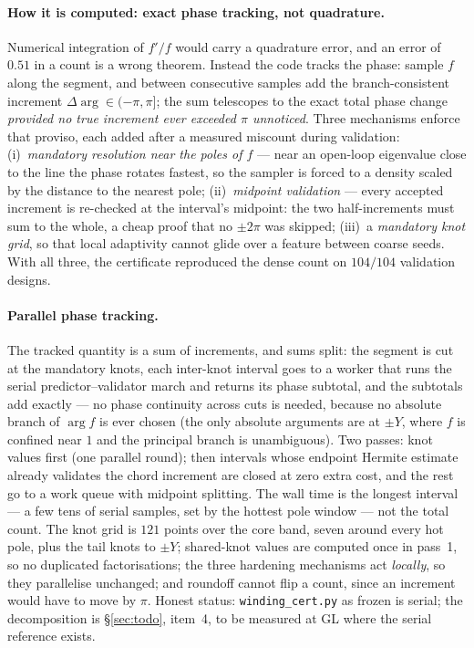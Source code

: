 \documentclass[11pt,a4paper]{article}
\newcommand{\code}[1]{\texttt{#1}}
\begin{document}
{\paragraph{How it is computed: exact phase tracking, not quadrature.}
Numerical integration of $f'/f$ would carry a quadrature error, and an error of $0.51$ in
a count is a wrong theorem.  Instead the code tracks the phase: sample $f$ along the
segment, and between consecutive samples add the branch-consistent increment
$\Delta\arg\in(-\pi,\pi]$; the sum telescopes to the exact total phase change
\emph{provided no true increment ever exceeded $\pi$ unnoticed}.  Three mechanisms
enforce that proviso, each added after a measured miscount during validation:
(i)~\emph{mandatory resolution near the poles of $f$} --- near an open-loop eigenvalue
close to the line the phase rotates fastest, so the sampler is forced to a density scaled
by the distance to the nearest pole; (ii)~\emph{midpoint validation} --- every accepted
increment is re-checked at the interval's midpoint: the two half-increments must sum to
the whole, a cheap proof that no $\pm2\pi$ was skipped; (iii)~a \emph{mandatory knot
grid}, so that local adaptivity cannot glide over a feature between coarse seeds.  With
all three, the certificate reproduced the dense count on $104/104$ validation designs.

\paragraph{Parallel phase tracking.}  The tracked quantity is a sum of increments, and sums split: the
segment is cut at the mandatory knots, each inter-knot interval goes to a worker that
runs the serial predictor--validator march and returns its phase subtotal, and the
subtotals add exactly --- no phase continuity across cuts is needed, because no absolute
branch of $\arg f$ is ever chosen (the only absolute arguments are at $\pm Y$, where $f$
is confined near $1$ and the principal branch is unambiguous).  Two passes: knot values
first (one parallel round); then intervals whose endpoint Hermite estimate already
validates the chord increment are closed at zero extra cost, and the rest go to a work
queue with midpoint splitting.  The wall time is the longest interval --- a few tens of
serial samples, set by the hottest pole window --- not the total count.  The knot grid is $121$ points over the core band, seven around every hot pole, plus the
tail knots to $\pm Y$; shared-knot values are computed once in pass~1, so no duplicated
factorisations; the three hardening mechanisms act \emph{locally}, so they parallelise
unchanged; and roundoff cannot flip a count, since an increment would have to move by
$\pi$.  Honest status: \code{winding\_cert.py} as frozen is serial; the decomposition is
\S\ref{sec:todo}, item~4, to be measured at GL where the serial reference exists.

}
\end{document}
